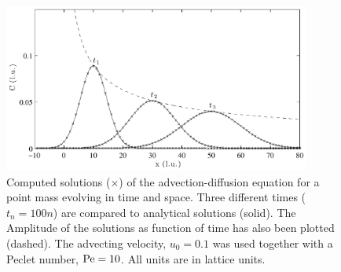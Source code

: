 \begin{figure}
\begin{center}
\includegraphics[width=0.9\textwidth]{fig/adv_dif_10_30_50.pdf}
\end{center}
\caption[Computed solutions of the advection-diffusion equation.]{Computed
  solutions ($\times$) of the advection-diffusion equation for a point
  mass evolving in time and space. Three different times ($t_n =
  100n$) are compared to analytical solutions (solid). The Amplitude
  of the solutions as function of time has also been plotted
  (dashed). The advecting velocity, $u_0 = 0.1$ was used together with
  a Peclet number, $\mathrm{Pe} = 10$. All units are in lattice units.}
\label{fig:adv-dif}
\end{figure}
